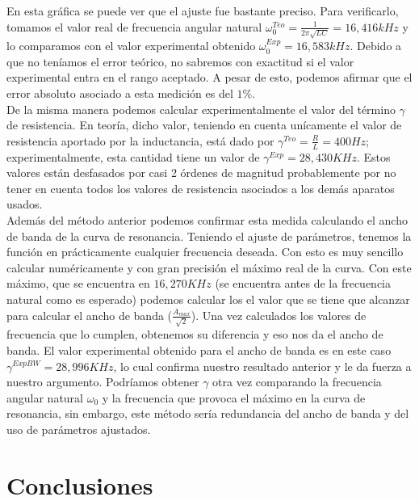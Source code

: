 \documentclass[%
 reprint,
 amsmath,amssymb,
 aps,
]{revtex4-1}
\begin{document}
{En esta gráfica se puede ver que el ajuste fue bastante preciso. Para verificarlo, tomamos el valor real de frecuencia angular natural $\omega_0^{Teo} = \frac{1}{2\pi \sqrt{LC}} = 16,416kHz$ y lo comparamos con el valor experimental obtenido  $\omega_0^{Exp} = 16,583kHz$. Debido a que no teníamos el error teórico, no sabremos con exactitud si el valor experimental entra en el rango aceptado. A pesar de esto, podemos afirmar que el error absoluto asociado a esta medición es del $1\%$.\\

De la misma manera podemos calcular experimentalmente el valor del t\'ermino $\gamma$ de resistencia. En teoría, dicho valor, teniendo en cuenta un\'icamente el valor de resistencia aportado por la inductancia, est\'a dado por $\gamma^{Teo} = \frac{R}{L} = 400Hz$; experimentalmente, esta cantidad tiene un valor de $\gamma^{Exp} = 28,430KHz$. Estos valores están desfasados por casi 2 \'ordenes de magnitud probablemente por no tener en cuenta todos los valores de resistencia asociados a los dem\'as aparatos usados.\\

Adem\'as del m\'etodo anterior podemos confirmar esta medida calculando el ancho de banda de la curva de resonancia. Teniendo el ajuste de par\'ametros, tenemos la funci\'on en pr\'acticamente cualquier frecuencia deseada. Con esto es muy sencillo calcular num\'ericamente y con gran precisi\'on el m\'aximo real de la curva. Con este m\'aximo, que se encuentra en $16,270KHz$ (se encuentra antes de la frecuencia natural como es esperado) podemos calcular los el valor que se tiene que alcanzar para calcular el ancho de banda ($\frac{A_{max}}{\sqrt{2}}$). Una vez calculados los valores de frecuencia que lo cumplen, obtenemos su diferencia y eso nos da el ancho de banda. El valor experimental obtenido para el ancho de banda es en este caso $\gamma^{ExpBW} = 28,996KHz$, lo cual confirma nuestro resultado anterior y le da fuerza a nuestro argumento. Podr\'iamos obtener $\gamma$ otra vez comparando la frecuencia angular natural $\omega_0$ y la frecuencia que provoca el m\'aximo en la curva de resonancia, sin embargo, este m\'etodo ser\'ia redundancia del ancho de banda y del uso de par\'ametros ajustados.\\
 


 


\section{\label{sec:level1}Conclusiones}



}
\end{document}
